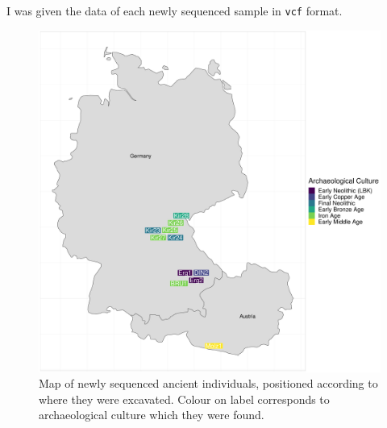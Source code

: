 I was given the data of each newly sequenced sample in \texttt{vcf} format. 

\begin{figure}[htp]
    \centering
    \includegraphics[width=1.0\textwidth]{../images/chapter4/sample_map.pdf}
    \caption{Map of newly sequenced ancient individuals, positioned according to where they were excavated. Colour on label corresponds to archaeological culture which they were found. }
    \label{fig:chapter4_intro_SamplesMap}
\end{figure}

